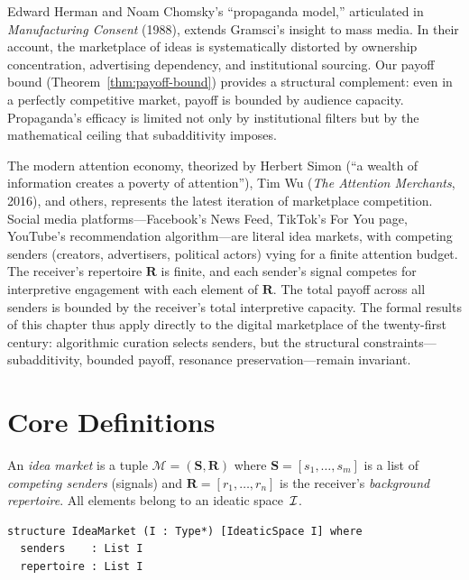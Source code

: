 Edward Herman and Noam Chomsky's ``propaganda model,'' articulated in
\textit{Manufacturing Consent} (1988), extends Gramsci's insight to mass
media.  In their account, the marketplace of ideas is systematically
distorted by ownership concentration, advertising dependency, and
institutional sourcing.  Our payoff bound
(Theorem~\ref{thm:payoff-bound}) provides a structural complement: even
in a perfectly competitive market, payoff is bounded by audience capacity.
Propaganda's efficacy is limited not only by institutional filters but by
the mathematical ceiling that subadditivity imposes.

The modern attention economy, theorized by Herbert Simon (``a wealth of
information creates a poverty of attention''), Tim Wu (\textit{The Attention
Merchants}, 2016), and others, represents the latest iteration of
marketplace competition.  Social media platforms---Facebook's News Feed,
TikTok's For You page, YouTube's recommendation algorithm---are literal
idea markets, with competing senders (creators, advertisers, political
actors) vying for a finite attention budget.  The receiver's repertoire
$\mathbf{R}$ is finite, and each sender's signal competes for interpretive
engagement with each element of $\mathbf{R}$.  The total payoff across all
senders is bounded by the receiver's total interpretive capacity.  The
formal results of this chapter thus apply directly to the digital
marketplace of the twenty-first century: algorithmic curation selects
senders, but the structural constraints---subadditivity, bounded payoff,
resonance preservation---remain invariant.

\section{Core Definitions}
\label{sec:ch11-defs}

\begin{definition}
\label{def:idea-market}
An \emph{idea market} is a tuple $\mathcal{M} = (\mathbf{S}, \mathbf{R})$
where $\mathbf{S} = [s_1, \dots, s_m]$ is a list of \emph{competing senders}
(signals) and $\mathbf{R} = [r_1, \dots, r_n]$ is the receiver's
\emph{background repertoire}.  All elements belong to an ideatic space~$\mathcal{I}$.
\end{definition}

\begin{lstlisting}[caption={IdeaMarket structure in Lean~4}]
structure IdeaMarket (I : Type*) [IdeaticSpace I] where
  senders    : List I
  repertoire : List I
\end{lstlisting}

